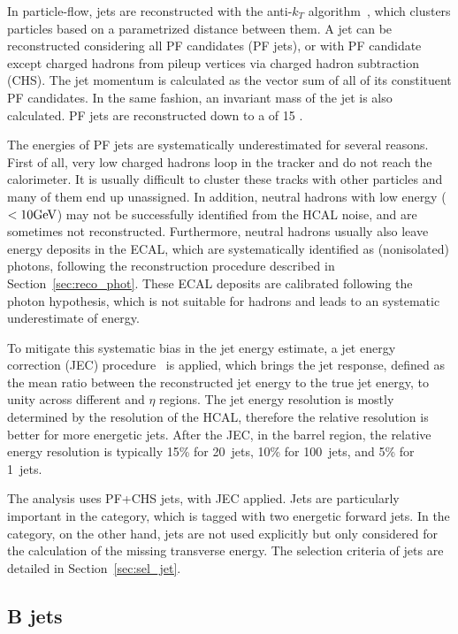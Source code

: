 In particle-flow, jets are reconstructed with the anti-$k_{T}$ algorithm~\cite{Cacciari_2008, fastjet},
which clusters particles based on a parametrized distance between them.
A jet can be reconstructed considering all PF candidates (PF jets), 
or with PF candidate except charged hadrons from pileup vertices via charged hadron subtraction (CHS). 
The jet momentum is calculated as the vector sum of all of its constituent PF candidates.
In the same fashion, an invariant mass of the jet is also calculated. 
PF jets are reconstructed down to a \pt of 15 \GeV.

The energies of PF jets are systematically underestimated for several reasons.
First of all, very low \pt charged hadrons loop in the tracker and do not reach the calorimeter.
It is usually difficult to cluster these tracks with other particles and many of them end up unassigned.
In addition, neutral hadrons with low energy ($< 10 \mbox{GeV}$) may not be successfully identified from the HCAL noise, and are sometimes not reconstructed.
Furthermore, neutral hadrons usually also leave energy deposits in the ECAL, 
which are systematically identified as (nonisolated) photons,
following the reconstruction procedure described in Section~\ref{sec:reco_phot}.
These ECAL deposits are calibrated following the photon hypothesis, 
which is not suitable for hadrons and leads to an systematic underestimate of energy.

To mitigate this systematic bias in the jet energy estimate, 
a jet energy correction (JEC) procedure~\cite{Khachatryan_2017} is applied,
which brings the jet response, defined as the mean ratio between the reconstructed jet energy to the true jet energy,
to unity across different \pt and $\eta$ regions.
The jet energy resolution is mostly determined by the resolution of the HCAL, 
therefore the relative resolution is better for more energetic jets.
After the JEC, in the barrel region, the relative energy resolution is typically 15\% for 20~\GeV jets,
10\% for 100~\GeV jets, and 5\% for 1~\TeV jets. 

The \hmm analysis uses PF+CHS jets, with JEC applied.
Jets are particularly important in the \qqH category, which is tagged with two energetic forward jets.
In the \VH category, on the other hand, jets are not used explicitly but only considered for the calculation of the missing transverse energy. 
The selection criteria of jets are detailed in Section~\ref{sec:sel_jet}.

\subsection{B jets}\label{sec:reco_btag}

